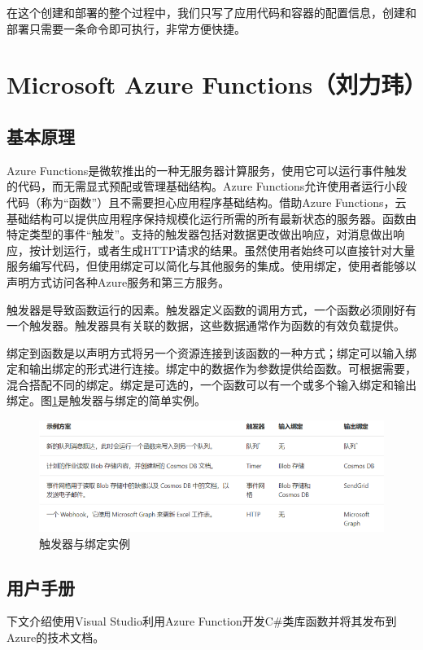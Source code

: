 \documentclass[11pt]{article}
\begin{document}
在这个创建和部署的整个过程中，我们只写了应用代码和容器的配置信息，创建和部署只需要一条命令即可执行，非常方便快捷。

\section{Microsoft Azure Functions（刘力玮）}
\subsection{基本原理}

Azure Functions是微软推出的一种无服务器计算服务，使用它可以运行事件触发的代码，而无需显式预配或管理基础结构。Azure Functions允许使用者运行小段代码（称为“函数”）且不需要担心应用程序基础结构。借助Azure Functions，云基础结构可以提供应用程序保持规模化运行所需的所有最新状态的服务器。函数由特定类型的事件“触发”。支持的触发器包括对数据更改做出响应，对消息做出响应，按计划运行，或者生成HTTP请求的结果。虽然使用者始终可以直接针对大量服务编写代码，但使用绑定可以简化与其他服务的集成。使用绑定，使用者能够以声明方式访问各种Azure服务和第三方服务。

触发器是导致函数运行的因素。触发器定义函数的调用方式，一个函数必须刚好有一个触发器。触发器具有关联的数据，这些数据通常作为函数的有效负载提供。

绑定到函数是以声明方式将另一个资源连接到该函数的一种方式；绑定可以输入绑定和输出绑定的形式进行连接。绑定中的数据作为参数提供给函数。可根据需要，混合搭配不同的绑定。绑定是可选的，一个函数可以有一个或多个输入绑定和输出绑定。图\ref{fig1}是触发器与绑定的简单实例。

\begin{figure}[h]	
	\centering
	\includegraphics[scale=0.6]{figs/1.png}        %
	\caption{触发器与绑定实例}
	\label{fig1}	
\end{figure}

\subsection{用户手册}
下文介绍使用Visual Studio利用Azure Function开发C\#类库函数并将其发布到 Azure的技术文档。
\end{document}
